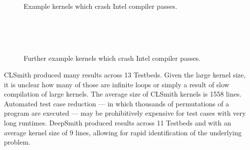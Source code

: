 \begin{figure}
  \centering
  \\%
  \\%
  \\%
  \\%
  \\%
  \caption[Example kernels which crash Intel compiler passes]{%
    Example kernels which crash Intel compiler passes.%
  }%
  \label{lst:intel-passes}
\end{figure}

\begin{figure}
	\centering
	\\%
	\\%
	\\%
	\caption[Further example kernels which crash Intel compiler passes]{%
		Further example kernels which crash Intel compiler passes.%
	}%
	\label{lst:further-intel-passes}
\end{figure}

CLSmith produced many \bto results across 13 Testbeds. Given the large kernel size, it is unclear how many of those are infinite loops or simply a result of slow compilation of large kernels. The average size of CLSmith \bto kernels is 1558 lines. Automated test case reduction --- in which thousands of permutations of a program are executed --- may be prohibitively expensive for test cases with very long runtimes. DeepSmith produced \bto results across 11 Testbeds and with an average kernel size of 9 lines, allowing for rapid identification of the underlying problem.

